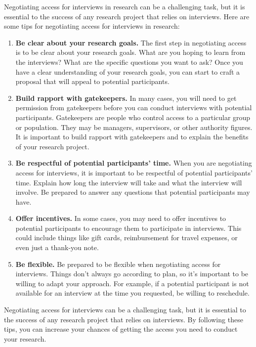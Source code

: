 \documentclass[
  b5paper]{book}
\begin{document}
Negotiating access for interviews in research can be a challenging task, but it is essential to the success of any research project that relies on interviews. Here are some tips for negotiating access for interviews in research:

\begin{enumerate}
\def\labelenumi{\arabic{enumi}.}
\item
  \textbf{Be clear about your research goals.} The first step in negotiating access is to be clear about your research goals. What are you hoping to learn from the interviews? What are the specific questions you want to ask? Once you have a clear understanding of your research goals, you can start to craft a proposal that will appeal to potential participants.
\item
  \textbf{Build rapport with gatekeepers.} In many cases, you will need to get permission from gatekeepers before you can conduct interviews with potential participants. Gatekeepers are people who control access to a particular group or population. They may be managers, supervisors, or other authority figures. It is important to build rapport with gatekeepers and to explain the benefits of your research project.
\item
  \textbf{Be respectful of potential participants' time.} When you are negotiating access for interviews, it is important to be respectful of potential participants' time. Explain how long the interview will take and what the interview will involve. Be prepared to answer any questions that potential participants may have.
\item
  \textbf{Offer incentives.} In some cases, you may need to offer incentives to potential participants to encourage them to participate in interviews. This could include things like gift cards, reimbursement for travel expenses, or even just a thank-you note.
\item
  \textbf{Be flexible.} Be prepared to be flexible when negotiating access for interviews. Things don't always go according to plan, so it's important to be willing to adapt your approach. For example, if a potential participant is not available for an interview at the time you requested, be willing to reschedule.
\end{enumerate}

Negotiating access for interviews can be a challenging task, but it is essential to the success of any research project that relies on interviews. By following these tips, you can increase your chances of getting the access you need to conduct your research.
\end{document}
